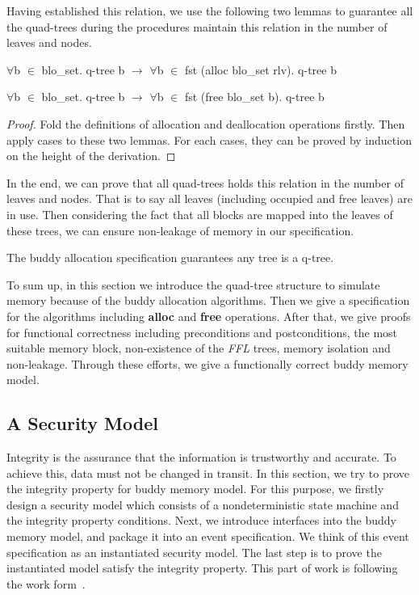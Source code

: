 Having established this relation, we use the following two lemmas to guarantee all the quad-trees during the procedures maintain this relation in the number of leaves and nodes.

\begin{lemma}
	$\forall$b $\in$ blo\_set. q-tree b $\longrightarrow$ $\forall$b $\in$ fst (alloc blo\_set rlv). q-tree b
\end{lemma}

\begin{lemma}
	$\forall$b $\in$ blo\_set. q-tree b $\longrightarrow$ $\forall$b $\in$ fst (free blo\_set b). q-tree b
\end{lemma}

\begin{proof}
	Fold the definitions of allocation and deallocation operations firstly. Then apply cases to these two lemmas. For each cases, they can be proved by induction on the height of the derivation.
\end{proof}

In the end, we can prove that all quad-trees holds this relation in the number of leaves and nodes. That is to say all leaves (including occupied and free leaves) are in use. Then considering the fact that all blocks are mapped into the leaves of these trees, we can ensure non-leakage of memory in our specification.

\begin{theorem}
	The buddy allocation specification guarantees any tree is a q-tree.
\end{theorem}

To sum up, in this section we introduce the quad-tree structure to simulate memory because of the buddy allocation algorithms. Then we give a specification for the algorithms including \textbf{alloc} and \textbf{free} operations. After that, we give proofs for functional correctness including preconditions and postconditions, the most suitable memory block, non-existence of the \emph{FFL} trees, memory isolation and non-leakage. Through these efforts, we give a functionally correct buddy memory model.

\subsection{A Security Model}\label{sec:security}

Integrity is the assurance that the information is trustworthy and accurate. To achieve this, data must not be changed in transit. In this section, we try to prove the integrity property for buddy memory model. For this purpose, we firstly design a security model which consists of a nondeterministic state machine and the integrity property conditions. Next, we introduce interfaces into the buddy memory model, and package it into an event specification. We think of this event specification as an instantiated security model. The last step is to prove the instantiated model satisfy the integrity property. This part of work is following the work form~\cite{reg_securitymodel}.


